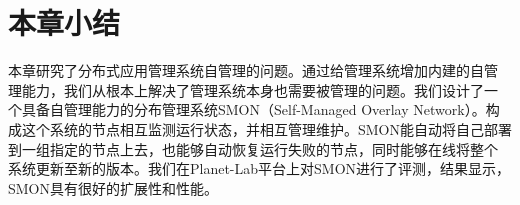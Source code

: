 \section{本章小结}
\label{sec:smon_conclusion}

本章研究了分布式应用管理系统自管理的问题。通过给管理系统增加内建的自管
理能力，我们从根本上解决了管理系统本身也需要被管理的问题。我们设计了一
个具备自管理能力的分布管理系统SMON（Self-Managed Overlay Network）。构
成这个系统的节点相互监测运行状态，并相互管理维护。SMON能自动将自己部署
到一组指定的节点上去，也能够自动恢复运行失败的节点，同时能够在线将整个
系统更新至新的版本。我们在Planet-Lab平台上对SMON进行了评测，结果显示，
SMON具有很好的扩展性和性能。
